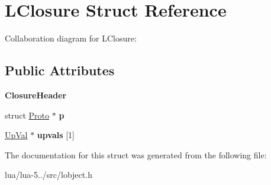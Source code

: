 \hypertarget{struct_l_closure}{\section{L\+Closure Struct Reference}
\label{struct_l_closure}
}


Collaboration diagram for L\+Closure\+:
\subsection*{Public Attributes}
\begin{DoxyCompactItemize}
\item 
\hypertarget{struct_l_closure_a6014e6d418f56b1ec866c449cab16044}{{\bfseries Closure\+Header}}\label{struct_l_closure_a6014e6d418f56b1ec866c449cab16044}

\item 
\hypertarget{struct_l_closure_a4cf173817d3897b0e70822e70d241d6c}{struct \hyperlink{struct_proto}{Proto} $\ast$ {\bfseries p}}\label{struct_l_closure_a4cf173817d3897b0e70822e70d241d6c}

\item 
\hypertarget{struct_l_closure_a94886e7c7df838f5fab36575b0554682}{\hyperlink{struct_up_val}{Up\+Val} $\ast$ {\bfseries upvals} \mbox{[}1\mbox{]}}\label{struct_l_closure_a94886e7c7df838f5fab36575b0554682}

\end{DoxyCompactItemize}


The documentation for this struct was generated from the following file\+:\begin{DoxyCompactItemize}
\item 
lua/lua-\/5../src/lobject.\+h\end{DoxyCompactItemize}
